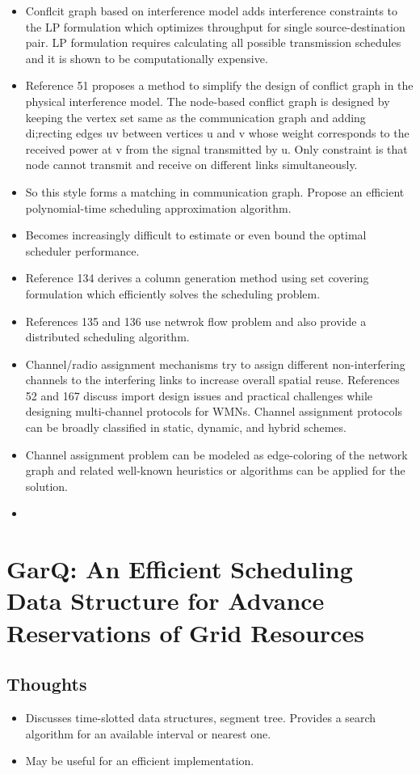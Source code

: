 \documentclass{article}
\begin{document}
\begin{itemize}
    \item Conflcit graph based on interference model adds interference constraints to the LP formulation which optimizes throughput for single source-destination pair.  LP formulation requires calculating all possible transmission schedules and it is shown to be computationally expensive.
    \item Reference 51 proposes a method to simplify the design of conflict graph in the physical interference model.  The node-based conflict graph is designed by keeping the vertex set same as the communication graph and adding di;recting edges uv between vertices u and v whose weight corresponds to the received power at v from the signal transmitted by u.  Only constraint is that node cannot transmit and receive on different links simultaneously.
    \item So this style forms a matching in communication graph.  Propose an efficient polynomial-time scheduling approximation algorithm.
    \item Becomes increasingly difficult to estimate or even bound the optimal scheduler performance.
    \item Reference 134 derives a column generation method using set covering formulation which efficiently solves the scheduling problem.
    \item References 135 and 136 use netwrok flow problem and also provide a distributed scheduling algorithm.
    \item Channel/radio assignment mechanisms try to assign different non-interfering channels to the interfering links to increase overall spatial reuse.  References 52 and 167 discuss import design issues and practical challenges while designing multi-channel protocols for WMNs.  Channel assignment protocols can be broadly classified in static, dynamic, and hybrid schemes.
    \item Channel assignment problem can be modeled as edge-coloring of the network graph and related well-known heuristics or algorithms can be applied for the solution.
    \item
\end{itemize}


\section{GarQ: An Efficient Scheduling Data Structure for Advance Reservations of Grid Resources}

\subsection{Thoughts}
\begin{itemize}
    \item Discusses time-slotted data structures, segment tree.  Provides a search algorithm for an available interval or nearest one.
    \item May be useful for an efficient implementation.
\end{itemize}
\end{document}
